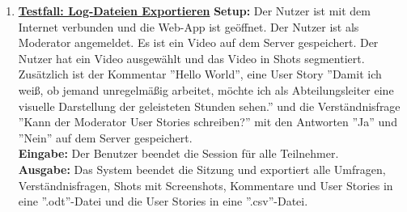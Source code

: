 \begin{enumerate}
	
	\item \underline{\textbf{Testfall: Log-Dateien Exportieren}} \linebreak
	\textbf{Setup:} Der Nutzer ist mit dem Internet verbunden und die Web-App ist geöffnet. Der Nutzer ist als Moderator angemeldet. Es ist ein Video auf dem Server gespeichert. Der Nutzer hat ein Video ausgewählt und das Video in Shots segmentiert. Zusätzlich ist der Kommentar ''Hello World'', eine User Story ''Damit ich weiß, ob jemand unregelmäßig arbeitet,
möchte ich als Abteilungsleiter eine visuelle Darstellung der geleisteten Stunden sehen.'' und die Verständnisfrage ''Kann der Moderator User Stories schreiben?'' mit den Antworten ''Ja'' und ''Nein'' auf dem Server gespeichert. \\
	\textbf{Eingabe:} Der Benutzer beendet die Session für alle Teilnehmer. \\
	\textbf{Ausgabe:} Das System beendet die Sitzung und exportiert alle Umfragen, Verständnisfragen, Shots mit Screenshots, Kommentare und User Stories in eine ''.odt''-Datei und die User Stories in eine ''.csv''-Datei.\\ 
	
\end{enumerate}
